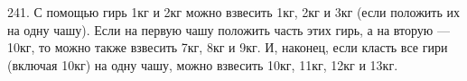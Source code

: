 241. С помощью гирь 1кг и 2кг можно взвесить 1кг, 2кг и 3кг (если положить их на одну чашу). Если на первую чашу положить часть этих гирь, а на вторую --- 10кг, то можно также взвесить 7кг, 8кг и 9кг. И, наконец, если класть все гири (включая 10кг) на одну чашу, можно взвесить 10кг, 11кг, 12кг и 13кг.\\
